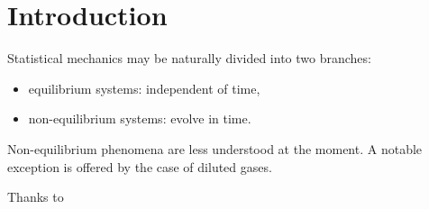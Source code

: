 \newpage
\section{Introduction}
Statistical mechanics may be naturally divided into two branches:
\begin{itemize}
    \item equilibrium systems: independent of time,
    \item non-equilibrium systems: evolve in time.
\end{itemize}
Non-equilibrium phenomena are less understood at the moment. A notable exception is offered by the case of diluted gases. 

Thanks to